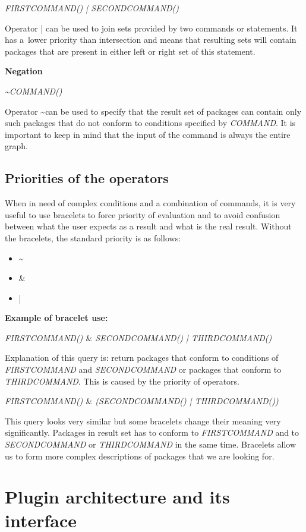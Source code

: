 \textit{FIRSTCOMMAND() | SECONDCOMMAND()}

Operator | can be used to join sets provided by two commands or statements. It has a~lower priority
than intersection and means that resulting sets will contain packages that are present in either
left or right set of this statement.

\textbf{Negation}

\textit{\textasciitilde COMMAND()}

Operator \textasciitilde\space can be used to specify that the result set of packages can contain only such
packages that do not conform to conditions specified by \textit{COMMAND}. It is important
to keep in mind that the input of the command is always the entire graph.

\subsection*{Priorities of the operators}

When in need of complex conditions and a combination of commands, it is very useful to use bracelets
to force priority of evaluation and to avoid confusion between what the user expects as a result and
what is the real result. Without the bracelets, the standard priority is as follows:

\begin{itemize}
  \item \textasciitilde
  \item \&
  \item |
\end{itemize}

\textbf{Example of bracelet use:}

\textit{FIRSTCOMMAND() $\&$ SECONDCOMMAND() | THIRDCOMMAND()}

Explanation of this query is: return packages that conform to conditions of \textit{FIRSTCOMMAND}
and \textit{SECONDCOMMAND} or packages that conform to \textit{THIRDCOMMAND}. This is caused
by the priority of operators.

\textit{FIRSTCOMMAND() $\&$ (SECONDCOMMAND() | THIRDCOMMAND())}

This query looks very similar but some bracelets change their meaning very significantly.
Packages in result set has to conform to \textit{FIRSTCOMMAND} and to \textit{SECONDCOMMAND} or 
\textit{THIRDCOMMAND} in the same time. Bracelets allow us to form more complex descriptions of
packages that we are looking for.

\section{Plugin architecture and its interface}

